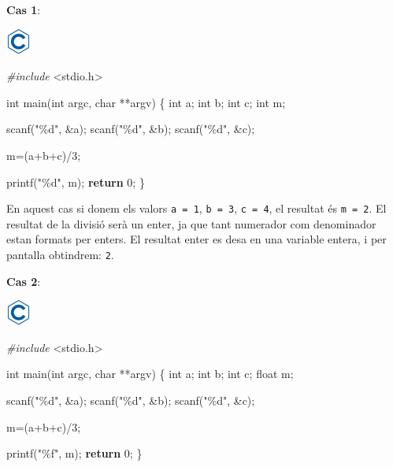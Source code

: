 \documentclass[
]{book}
\newenvironment{Shaded}{\begin{snugshade}}{\end{snugshade}}
\newcommand{\ControlFlowTok}[1]{\textcolor[rgb]{0.13,0.29,0.53}{\textbf{#1}}}
\newcommand{\DataTypeTok}[1]{\textcolor[rgb]{0.13,0.29,0.53}{#1}}
\newcommand{\DecValTok}[1]{\textcolor[rgb]{0.00,0.00,0.81}{#1}}
\newcommand{\ImportTok}[1]{#1}
\newcommand{\NormalTok}[1]{#1}
\newcommand{\PreprocessorTok}[1]{\textcolor[rgb]{0.56,0.35,0.01}{\textit{#1}}}
\newcommand{\StringTok}[1]{\textcolor[rgb]{0.31,0.60,0.02}{#1}}
\begin{document}
\textbf{Cas 1}:

\includegraphics{./img/c.png}

\begin{Shaded}
\begin{Highlighting}[]
\PreprocessorTok{\#include }\ImportTok{\textless{}stdio.h\textgreater{}}

\DataTypeTok{int}\NormalTok{ main(}\DataTypeTok{int}\NormalTok{ argc, }\DataTypeTok{char}\NormalTok{ **argv) \{}
    \DataTypeTok{int}\NormalTok{ a;}
    \DataTypeTok{int}\NormalTok{ b;}
    \DataTypeTok{int}\NormalTok{ c;}
    \DataTypeTok{int}\NormalTok{ m;}

\NormalTok{    scanf(}\StringTok{"\%d"}\NormalTok{, \&a);}
\NormalTok{    scanf(}\StringTok{"\%d"}\NormalTok{, \&b);}
\NormalTok{    scanf(}\StringTok{"\%d"}\NormalTok{, \&c);}

\NormalTok{    m=(a+b+c)/}\DecValTok{3}\NormalTok{;}

\NormalTok{    printf(}\StringTok{"\%d"}\NormalTok{, m);}
    \ControlFlowTok{return} \DecValTok{0}\NormalTok{;}
\NormalTok{\}}
\end{Highlighting}
\end{Shaded}

En aquest cas si donem els valors \texttt{a\ =\ 1}, \texttt{b\ =\ 3}, \texttt{c\ =\ 4}, el resultat és \texttt{m\ =\ 2}. El resultat de la divisió serà un enter, ja que tant numerador com denominador estan formats per enters. El resultat enter es desa en una variable entera, i per pantalla obtindrem: \texttt{2}.

\textbf{Cas 2}:

\includegraphics{./img/c.png}

\begin{Shaded}
\begin{Highlighting}[]
\PreprocessorTok{\#include }\ImportTok{\textless{}stdio.h\textgreater{}}

\DataTypeTok{int}\NormalTok{ main(}\DataTypeTok{int}\NormalTok{ argc, }\DataTypeTok{char}\NormalTok{ **argv) \{}
    \DataTypeTok{int}\NormalTok{ a;}
    \DataTypeTok{int}\NormalTok{ b;}
    \DataTypeTok{int}\NormalTok{ c;}
    \DataTypeTok{float}\NormalTok{ m;}

\NormalTok{    scanf(}\StringTok{"\%d"}\NormalTok{, \&a);}
\NormalTok{    scanf(}\StringTok{"\%d"}\NormalTok{, \&b);}
\NormalTok{    scanf(}\StringTok{"\%d"}\NormalTok{, \&c);}

\NormalTok{    m=(a+b+c)/}\DecValTok{3}\NormalTok{;}

\NormalTok{    printf(}\StringTok{"\%f"}\NormalTok{, m);}
    \ControlFlowTok{return} \DecValTok{0}\NormalTok{;}
\NormalTok{\}}
\end{Highlighting}
\end{Shaded}
\end{document}
